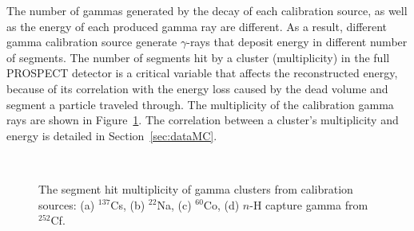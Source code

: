 The number of gammas generated by the decay of each calibration source, as well as the energy of each produced gamma ray are different. 
As a result, different gamma calibration source generate $\gamma$-rays that deposit energy in different number of segments.
The number of segments hit by a cluster (multiplicity) in the full PROSPECT detector is a critical variable that affects the reconstructed energy, because of its correlation with the energy loss caused by the dead volume and segment a particle traveled through.
The multiplicity of the calibration gamma rays are shown in Figure~\ref{fig:gammamulti}.
The correlation between a cluster's multiplicity and energy is detailed in Section~\ref{sec:dataMC}.

\begin{figure}[!ht]
\centering
{}\quad
{} \\
\caption[The segment hit multiplicity of calibration gamma clusters]{The segment hit multiplicity of gamma clusters from calibration sources: (a) $^{137}$Cs, (b) $^{22}$Na, (c) $^{60}$Co, (d) $n$-H capture gamma from $^{252}$Cf.
}
\label{fig:gammamulti}
\end{figure}

